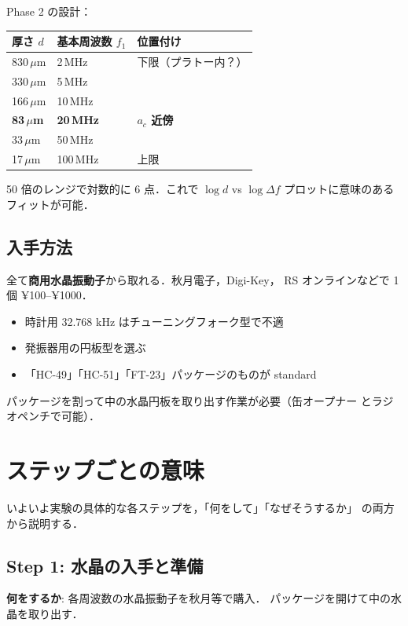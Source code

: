 \documentclass[11pt,a4paper]{article}
\begin{document}
Phase 2 の設計：

\begin{center}
\begin{tabular}{lll}
\toprule
厚さ $d$ & 基本周波数 $f_1$ & 位置付け \\
\midrule
830\,$\mu$m & 2\,MHz & 下限（プラトー内？）\\
330\,$\mu$m & 5\,MHz & \\
166\,$\mu$m & 10\,MHz & \\
\textbf{83\,$\mu$m} & \textbf{20\,MHz} & \textbf{$a_c$ 近傍}\\
33\,$\mu$m & 50\,MHz & \\
17\,$\mu$m & 100\,MHz & 上限 \\
\bottomrule
\end{tabular}
\end{center}

50 倍のレンジで対数的に 6 点．これで $\log d$ vs $\log\Delta f$
プロットに意味のあるフィットが可能．

\subsection{入手方法}

全て\textbf{商用水晶振動子}から取れる．秋月電子，Digi-Key，
RS オンラインなどで 1 個 ¥100--¥1000．

\begin{itemize}
\item 時計用 32.768 kHz はチューニングフォーク型で不適
\item 発振器用の円板型を選ぶ
\item 「HC-49」「HC-51」「FT-23」パッケージのものが standard
\end{itemize}

パッケージを割って中の水晶円板を取り出す作業が必要（缶オープナー
とラジオペンチで可能）．

\section{ステップごとの意味}

いよいよ実験の具体的な各ステップを，「何をして」「なぜそうするか」
の両方から説明する．

\subsection{Step 1: 水晶の入手と準備}

\textbf{何をするか}: 各周波数の水晶振動子を秋月等で購入．
パッケージを開けて中の水晶を取り出す．
\end{document}
